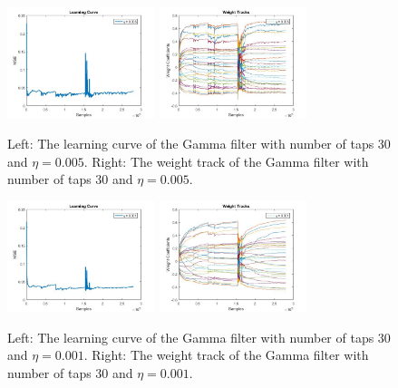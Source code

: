 \documentclass[conference]{IEEEtran}
\begin{document}
	\begin{figure}[htbp]
	\centering
	\includegraphics[width = 1.7in]{Gamma_LC_eta2_mu15_M30.jpg}
	\includegraphics[width=1.7in]{Gamma_WT_eta4_mu15_M30.jpg}
	\caption{Left: The learning curve of the Gamma filter with number of taps 30 and  $\eta =0.005$. Right: The weight track of the Gamma filter with number of taps 30 and  $\eta = 0.005$.}
	\label{gammaLCWT4}
	\end{figure}


	\begin{figure}[htbp]
	\centering
	\includegraphics[width = 1.7in]{Gamma_LC_eta1_mu15_M30.jpg}
	\includegraphics[width=1.7in]{GammaWT_eta5_mu15_M30.jpg}
	\caption{Left: The learning curve of the Gamma filter with number of taps 30 and  $\eta =0.001$. Right: The weight track of the Gamma filter with number of taps 30 and  $\eta = 0.001$.}
	\label{gammaLCWT5}
	\end{figure}
\end{document}
